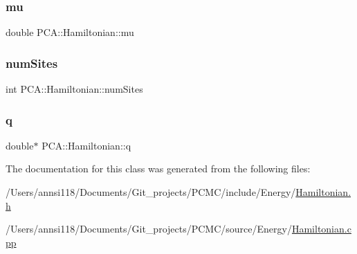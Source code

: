\subsubsection{\texorpdfstring{mu}{mu}}
{\footnotesize\ttfamily double P\+C\+A\+::\+Hamiltonian\+::mu\hspace{0.3cm}{\ttfamily [private]}}

\hypertarget{class_p_c_a_1_1_hamiltonian_ad974eb16fba08e8e07cd60756fd223fb}{}\label{class_p_c_a_1_1_hamiltonian_ad974eb16fba08e8e07cd60756fd223fb} 
\subsubsection{\texorpdfstring{num\+Sites}{numSites}}
{\footnotesize\ttfamily int P\+C\+A\+::\+Hamiltonian\+::num\+Sites\hspace{0.3cm}{\ttfamily [private]}}

\hypertarget{class_p_c_a_1_1_hamiltonian_a2ff873d072df1447deb904d615fe9f02}{}\label{class_p_c_a_1_1_hamiltonian_a2ff873d072df1447deb904d615fe9f02} 
\subsubsection{\texorpdfstring{q}{q}}
{\footnotesize\ttfamily double$\ast$ P\+C\+A\+::\+Hamiltonian\+::q\hspace{0.3cm}{\ttfamily [private]}}



The documentation for this class was generated from the following files\+:\begin{DoxyCompactItemize}
\item 
/\+Users/annsi118/\+Documents/\+Git\+\_\+projects/\+P\+C\+M\+C/include/\+Energy/\hyperlink{_hamiltonian_8h}{Hamiltonian.\+h}\item 
/\+Users/annsi118/\+Documents/\+Git\+\_\+projects/\+P\+C\+M\+C/source/\+Energy/\hyperlink{_hamiltonian_8cpp}{Hamiltonian.\+cpp}\end{DoxyCompactItemize}
